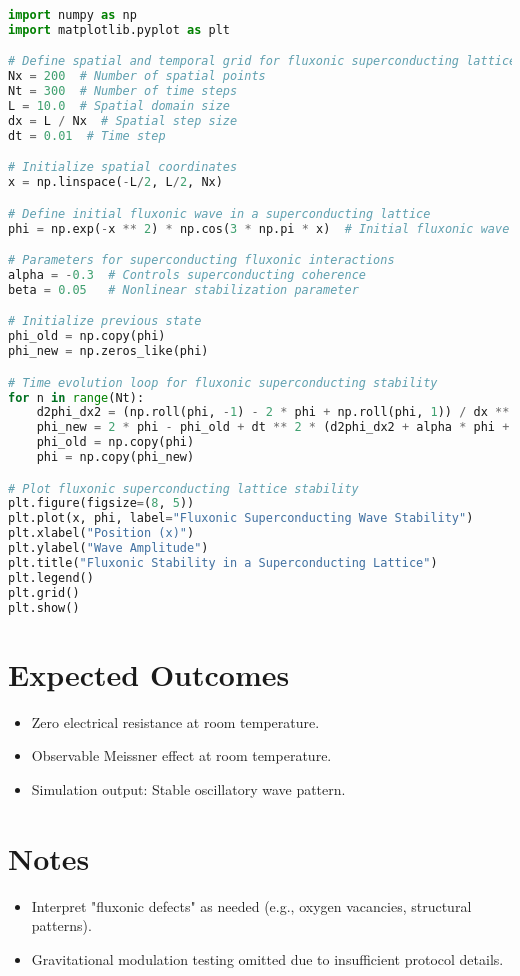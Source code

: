 \documentclass[a4paper,12pt]{article}
\begin{document}
\begin{lstlisting}[language=Python]
import numpy as np
import matplotlib.pyplot as plt

# Define spatial and temporal grid for fluxonic superconducting lattice
Nx = 200  # Number of spatial points
Nt = 300  # Number of time steps
L = 10.0  # Spatial domain size
dx = L / Nx  # Spatial step size
dt = 0.01  # Time step

# Initialize spatial coordinates
x = np.linspace(-L/2, L/2, Nx)

# Define initial fluxonic wave in a superconducting lattice
phi = np.exp(-x ** 2) * np.cos(3 * np.pi * x)  # Initial fluxonic wave function

# Parameters for superconducting fluxonic interactions
alpha = -0.3  # Controls superconducting coherence
beta = 0.05   # Nonlinear stabilization parameter

# Initialize previous state
phi_old = np.copy(phi)
phi_new = np.zeros_like(phi)

# Time evolution loop for fluxonic superconducting stability
for n in range(Nt):
    d2phi_dx2 = (np.roll(phi, -1) - 2 * phi + np.roll(phi, 1)) / dx ** 2
    phi_new = 2 * phi - phi_old + dt ** 2 * (d2phi_dx2 + alpha * phi + beta * phi ** 3)
    phi_old = np.copy(phi)
    phi = np.copy(phi_new)

# Plot fluxonic superconducting lattice stability
plt.figure(figsize=(8, 5))
plt.plot(x, phi, label="Fluxonic Superconducting Wave Stability")
plt.xlabel("Position (x)")
plt.ylabel("Wave Amplitude")
plt.title("Fluxonic Stability in a Superconducting Lattice")
plt.legend()
plt.grid()
plt.show()
\end{lstlisting}

\section{Expected Outcomes}
\begin{itemize}
    \item Zero electrical resistance at room temperature.
    \item Observable Meissner effect at room temperature.
    \item Simulation output: Stable oscillatory wave pattern.
\end{itemize}

\section{Notes}
\begin{itemize}
    \item Interpret "fluxonic defects" as needed (e.g., oxygen vacancies, structural patterns).
    \item Gravitational modulation testing omitted due to insufficient protocol details.
\end{itemize}
\end{document}
